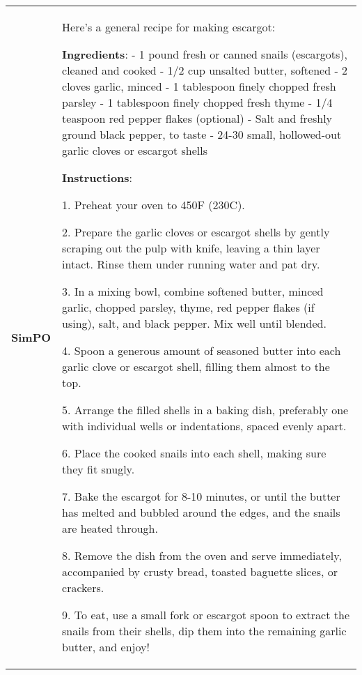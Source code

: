 \begin{table}[!h]
    \centering
        \ttfamily
        \small
    \begin{tabular}{lp{11.5cm}}
        \midrule
        \bf{SimPO} &
Here's a general recipe for making escargot:\newline

\textbf{Ingredients}:\newline
- 1 pound fresh or canned snails (escargots), cleaned and cooked\newline
- 1/2 cup unsalted butter, softened\newline
- 2 cloves garlic, minced\newline
- 1 tablespoon finely chopped fresh parsley\newline
- 1 tablespoon finely chopped fresh thyme\newline
- 1/4 teaspoon red pepper flakes (optional)\newline
- Salt and freshly ground black pepper, to taste\newline
- 24-30 small, hollowed-out garlic cloves or escargot shells\newline

\textbf{Instructions}:

1. Preheat your oven to 450F (230C).

2. Prepare the garlic cloves or escargot shells by gently scraping out the pulp with knife, leaving a thin layer intact. Rinse them under running water and pat dry.

3. In a mixing bowl, combine softened butter, minced garlic, chopped parsley, thyme, red pepper flakes (if using), salt, and black pepper. Mix well until blended.

4. Spoon a generous amount of seasoned butter into each garlic clove or escargot shell, filling them almost to the top.

5. Arrange the filled shells in a baking dish, preferably one with individual wells or indentations, spaced evenly apart.

6. Place the cooked snails into each shell, making sure they fit snugly.

7. Bake the escargot for 8-10 minutes, or until the butter has melted and bubbled around the edges, and the snails are heated through.

8. Remove the dish from the oven and serve immediately, accompanied by crusty bread, toasted baguette slices, or crackers.

9. To eat, use a small fork or escargot spoon to extract the snails from their shells, dip them into the remaining garlic butter, and enjoy!


\end{tabular}
\end{table}
